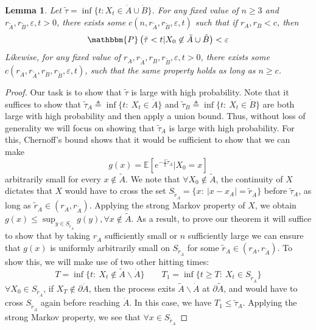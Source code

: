 \documentclass[nofootinbib,english, aip, jcp, priprint, graphicx,floatfix]{revtex4-1}
\newtheorem{lemma}{Lemma}
\theoremstyle{plain}
\theoremstyle{definition}
\theoremstyle{plain}
\begin{document}
\begin{lemma}
\label{lem:longtime}Let $\tilde{\tau}= \inf \{ t : X_t \in \dot A \cup \dot B\}$. For any fixed value of $n
\geqslant 3$ and $r_{\tilde{A}}, r_{\tilde{B}}, \varepsilon,t > 0$, there
exists some $c (n, r_{\tilde{A}}, r_{\tilde{B}}, \varepsilon,t)$ such that if
$r_{\dot A}, r_{\dot B} < c$, then
\[ \mathbbm{P} \left( \tilde{\tau} < t |X_0 \not\in\tilde{A} \cup \tilde{B} \right) < \varepsilon \]
Likewise, for any fixed value of $r_{\dot A}, r_{\tilde{A}}, r_{\dot B}, r_{\tilde{B}},
\varepsilon,t > 0$, there exists some $c (r_{\dot A}, r_{\tilde{A}}, r_{\dot B},
r_{\tilde{B}}, \varepsilon,t)$, such that the same property holds as long as $n \geqslant c$.
\end{lemma}\begin{proof}
Our task is to show that $\tilde \tau$ is large with high probability.  Note that it suffices to show that $\tilde \tau_A \triangleq \inf\{t:\ X_t\in \dot A\}$ and $\tilde \tau_B \triangleq \inf\{t:\ X_t\in \dot B\}$ are both large with high probability and then apply a union bound.  Thus, without loss of generality we will focus on showing that $\tilde \tau_A$ is large with high probability.  For this, Chernoff's bound shows that it would be sufficient to show that we can make
\[
g(x)=\mathbb{E}[e^{-\frac{1}{2}\tilde \tau_A}|X_0=x]
\] 
arbitrarily small for every $x\notin \tilde A$. We note that $\forall X_0 \notin \tilde A$, the continuity of $X$ dictates that $X$ would have to cross the set $S_{\tilde r_{\dot A}}=\{x:\ |x-x_A| = \tilde r_{\dot A}\}$ before $\tilde \tau_A$, as long as $\tilde r_{\dot A} \in (r_{\dot A},r_{\tilde A})$.  Applying the strong Markov property of $X$, we obtain $g(x)\leq \sup_{y\in S_{\tilde r_{\dot A}}}g(y), \forall x \notin \tilde A$. As a result, to prove our theorem it will suffice to show that by taking $r_{\dot A}$ sufficiently small or $n$ sufficiently large we can ensure that $g(x)$ is uniformly arbitrarily small on $S_{\tilde r_{\dot A}}$ for some $\tilde r_{\dot A} \in (r_{\dot A},r_{\tilde A})$.  To show this, we will make use of two other hitting times:
\[
T =\inf \{t:\ X_t \notin \tilde A \backslash \dot A\} 
\qquad
T_1 =\inf \{t\geq T:\ X_t \in S_{\tilde r_{\dot A}}\} 
\]
$\forall X_0 \in S_{\tilde r_{\dot A}}$, if $X_T\notin \partial\dot A$, then the process exits $\tilde A \backslash \dot A$ at $\partial \tilde A$, and would have to cross $S_{\tilde r_{\dot A}}$ again before reaching $\dot A$. In this case, we have $T_1 \leq \tilde \tau_A$.  Applying the strong Markov property, we see that $\forall x\in S_{\tilde r_{\dot A}}$

\end{proof}
\end{document}
